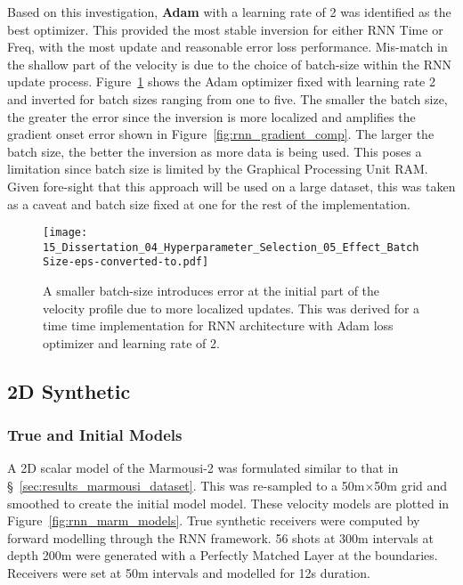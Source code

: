 Based on this investigation, \textbf{Adam} with a learning rate of 2 was identified as the best optimizer. This provided the most stable inversion for either RNN Time or Freq, with the most update and reasonable error loss performance. Mis-match in the shallow part of the velocity is due to the choice of batch-size within the RNN update process. Figure~\ref{fig:rnn_hp_tuning_batch_size} shows the Adam optimizer fixed with learning rate 2 and inverted for batch sizes ranging from one to five. The smaller the batch size, the greater the error since the inversion is more localized and amplifies the gradient onset error shown in Figure~\ref{fig:rnn_gradient_comp}. The larger the batch size, the better the inversion as more data is being used. This poses a limitation since batch size is limited by the Graphical Processing Unit RAM. Given fore-sight that this approach will be used on a large dataset, this was taken as a caveat and batch size fixed at one for the rest of the implementation. 

\begin{figure}[ht!]
    \centering
    \texttt{[image: 15\_Dissertation\_04\_Hyperparameter\_Selection\_05\_Effect\_BatchSize-eps-converted-to.pdf]}
    \caption[Effect of batch-size on inversion process.]{A smaller batch-size introduces error at the initial part of the velocity profile due to more localized updates. This was derived for a time time implementation for RNN architecture with Adam loss optimizer and learning rate of 2.}
    \label{fig:rnn_hp_tuning_batch_size}
\end{figure}
\clearpage
\subsection{2D Synthetic}
\subsubsection{True and Initial Models}
A 2D scalar model of the Marmousi-2 was formulated similar to that in §~\ref{sec:results_marmousi_dataset}. This was re-sampled to a 50\si{m}$\times$50\si{m} grid and smoothed to create the initial model model. These velocity models are plotted in Figure~\ref{fig:rnn_marm_models}. True synthetic receivers were computed by forward modelling through the RNN framework. 56 shots at 300m intervals at depth 200m were generated with a Perfectly Matched Layer at the boundaries. Receivers were set at 50m intervals and modelled for 12\si{s} duration.

